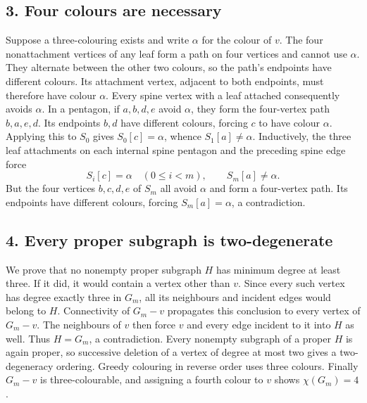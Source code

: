 \subsection*{3. Four colours are necessary}
Suppose a three-colouring exists and write $\alpha$ for the colour of $v$. The four nonattachment vertices of any leaf form a path on four vertices and cannot use $\alpha$. They alternate between the other two colours, so the path's endpoints have different colours. Its attachment vertex, adjacent to both endpoints, must therefore have colour $\alpha$. Every spine vertex with a leaf attached consequently avoids $\alpha$.
In a pentagon, if $a,b,d,e$ avoid $\alpha$, they form the four-vertex path $b,a,e,d$. Its endpoints $b,d$ have different colours, forcing $c$ to have colour $\alpha$. Applying this to $S_0$ gives $S_0[c]=\alpha$, whence $S_1[a]\ne\alpha$. Inductively, the three leaf attachments on each internal spine pentagon and the preceding spine edge force
\[
 S_i[c]=\alpha\quad(0\le i<m),\qquad S_m[a]\ne\alpha.
\]
But the four vertices $b,c,d,e$ of $S_m$ all avoid $\alpha$ and form a four-vertex path. Its endpoints have different colours, forcing $S_m[a]=\alpha$, a contradiction.

\subsection*{4. Every proper subgraph is two-degenerate}
We prove that no nonempty proper subgraph $H$ has minimum degree at least three. If it did, it would contain a vertex other than $v$. Since every such vertex has degree exactly three in $G_m$, all its neighbours and incident edges would belong to $H$. Connectivity of $G_m-v$ propagates this conclusion to every vertex of $G_m-v$. The neighbours of $v$ then force $v$ and every edge incident to it into $H$ as well. Thus $H=G_m$, a contradiction.
Every nonempty subgraph of a proper $H$ is again proper, so successive deletion of a vertex of degree at most two gives a two-degeneracy ordering. Greedy colouring in reverse order uses three colours. Finally $G_m-v$ is three-colourable, and assigning a fourth colour to $v$ shows $\chi(G_m)=4$.

